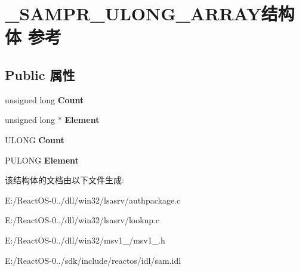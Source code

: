 \hypertarget{struct___s_a_m_p_r___u_l_o_n_g___a_r_r_a_y}{}\section{\+\_\+\+S\+A\+M\+P\+R\+\_\+\+U\+L\+O\+N\+G\+\_\+\+A\+R\+R\+A\+Y结构体 参考}
\label{struct___s_a_m_p_r___u_l_o_n_g___a_r_r_a_y}
\subsection*{Public 属性}
\begin{DoxyCompactItemize}
\item 
\mbox{\label{struct___s_a_m_p_r___u_l_o_n_g___a_r_r_a_y_a62e296ebed659a4a7c698848387a99fd}} 
unsigned long {\bfseries Count}
\item 
\mbox{\label{struct___s_a_m_p_r___u_l_o_n_g___a_r_r_a_y_a37fb93872e5017abd898e7e073d2ccda}} 
unsigned long $\ast$ {\bfseries Element}
\item 
\mbox{\label{struct___s_a_m_p_r___u_l_o_n_g___a_r_r_a_y_a5193f12462c36a5683830c475918ee23}} 
U\+L\+O\+NG {\bfseries Count}
\item 
\mbox{\label{struct___s_a_m_p_r___u_l_o_n_g___a_r_r_a_y_abefb16bc3d24990f9e588cd751dfa827}} 
P\+U\+L\+O\+NG {\bfseries Element}
\end{DoxyCompactItemize}


该结构体的文档由以下文件生成\+:\begin{DoxyCompactItemize}
\item 
E\+:/\+React\+O\+S-\/0../dll/win32/lsasrv/authpackage.\+c\item 
E\+:/\+React\+O\+S-\/0../dll/win32/lsasrv/lookup.\+c\item 
E\+:/\+React\+O\+S-\/0../dll/win32/msv1\+\_/msv1\+\_.\+h\item 
E\+:/\+React\+O\+S-\/0../sdk/include/reactos/idl/sam.\+idl\end{DoxyCompactItemize}
